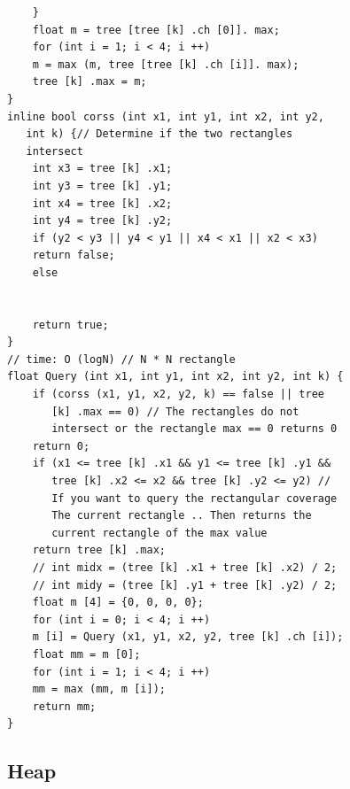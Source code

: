 \documentclass[11pt]{article}
\begin{document}
\begin{verbatim}
    }
    float m = tree [tree [k] .ch [0]]. max;
    for (int i = 1; i < 4; i ++)
    m = max (m, tree [tree [k] .ch [i]]. max);
    tree [k] .max = m;
}
inline bool corss (int x1, int y1, int x2, int y2,
   int k) {// Determine if the two rectangles
   intersect
    int x3 = tree [k] .x1;
    int y3 = tree [k] .y1;
    int x4 = tree [k] .x2;
    int y4 = tree [k] .y2;
    if (y2 < y3 || y4 < y1 || x4 < x1 || x2 < x3)
    return false;
    else


    return true;
}
// time: O (logN) // N * N rectangle
float Query (int x1, int y1, int x2, int y2, int k) {
    if (corss (x1, y1, x2, y2, k) == false || tree
       [k] .max == 0) // The rectangles do not
       intersect or the rectangle max == 0 returns 0
    return 0;
    if (x1 <= tree [k] .x1 && y1 <= tree [k] .y1 &&
       tree [k] .x2 <= x2 && tree [k] .y2 <= y2) //
       If you want to query the rectangular coverage
       The current rectangle .. Then returns the
       current rectangle of the max value
    return tree [k] .max;
    // int midx = (tree [k] .x1 + tree [k] .x2) / 2;
    // int midy = (tree [k] .y1 + tree [k] .y2) / 2;
    float m [4] = {0, 0, 0, 0};
    for (int i = 0; i < 4; i ++)
    m [i] = Query (x1, y1, x2, y2, tree [k] .ch [i]);
    float mm = m [0];
    for (int i = 1; i < 4; i ++)
    mm = max (mm, m [i]);
    return mm;
}
\end{verbatim}
\endgroup

\subsection{Heap}
\end{document}
